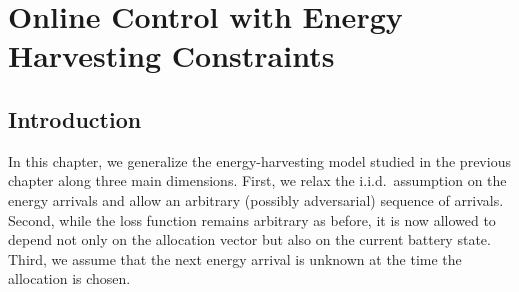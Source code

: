 \chapter{Online Control with Energy Harvesting Constraints}

\label{Section:ChapControl}






\section{Introduction}

In this chapter, we generalize the energy-harvesting model studied in the previous chapter along three main dimensions. First, we relax the i.i.d.\ assumption on the energy arrivals and allow an arbitrary (possibly adversarial) sequence of arrivals. Second, while the loss function remains arbitrary as before, it is now allowed to depend not only on the allocation vector but also on the current battery state. Third, we assume that the next energy arrival is unknown at the time the allocation is chosen. 

